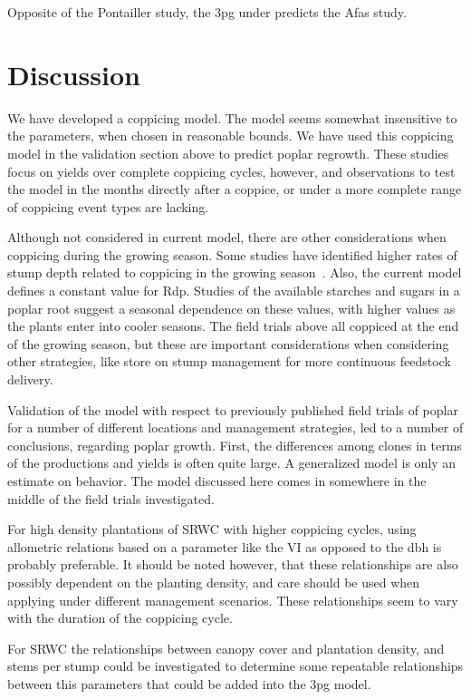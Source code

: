 \documentclass[10pt]{article}
\begin{document}
Opposite of the Pontailler study, the \ac{3pg} under predicts the Afas study.

\section*{Discussion}


We have developed a coppicing model.  The model seems somewhat insensitive to
the parameters, when chosen in reasonable bounds.  We have used this coppicing
model in the validation section above to predict poplar regrowth.  These studies
focus on yields over complete coppicing cycles, however, and observations to
test the model in the months directly after a coppice, or under a more complete
range of coppicing event types are lacking.

Although not considered in current model, there are other considerations when
coppicing during the growing season.  Some studies have identified higher rates
of stump depth related to coppicing in the growing season~\cite{}.  Also, the
current model defines a constant value for \ac{Rdp}.  Studies of the available
starches and sugars in a poplar root suggest a seasonal dependence on these
values, with higher values as the plants enter into cooler
seasons\cite{Regier2010}.  The field trials above all coppiced at the end of the
growing season, but these are important considerations when considering other
strategies, like store on stump management for more continuous feedstock
delivery.

Validation of the model with respect to previously published field trials of
poplar for a number of different locations and management strategies, led to a
number of conclusions, regarding poplar growth.  First, the differences among
clones in terms of the productions and yields is often quite large.  A
generalized model is only an estimate on behavior.  The model discussed here
comes in somewhere in the middle of the field trials investigated.

For high density plantations of \ac{SRWC} with higher coppicing cycles, using
allometric relations based on a parameter like the \acf{VI} as opposed to the
\ac{dbh} is probably preferable.  It should be noted however, that these
relationships are also possibly dependent on the planting density, and care
should be used when applying under different management scenarios.  These
relationships seem to vary with the duration of the coppicing cycle.

For \ac{SRWC} the relationships between canopy cover and plantation density, and
stems per stump could be investigated to determine some repeatable relationships
between this parameters that could be added into the \ac{3pg} model. 
\end{document}

